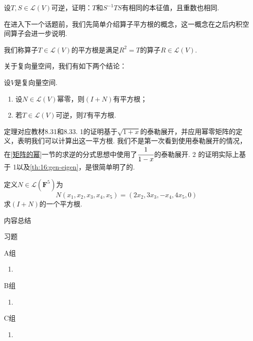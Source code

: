 \begin{example}
    设$T,S\in \mathcal{L}(V)$可逆，证明：$T$和$S^{-1}TS$有相同的本征值，且重数也相同.
\end{example}
在进入下一个话题前，我们先简单介绍算子平方根的概念，这一概念在之后内积空间算子会进一步说明.
\begin{definition}
    我们称算子$T\in \mathcal{L}(V)$的平方根是满足$R^2=T$的算子$R\in \mathcal{L}(V)$.
\end{definition}
关于复向量空间，我们有如下两个结论：
\begin{theorem} \label{th:16:np-sqrt}
    设$V$是复向量空间.
    \begin{enumerate}
        \item 设$N\in \mathcal{L}(V)$幂零，则$(I+N)$有平方根；

        \item 若$T\in \mathcal{L}(V)$可逆，则$T$有平方根.
    \end{enumerate}
\end{theorem}
定理对应教材8.31和8.33. 1的证明基于$\sqrt{1+x}$的泰勒展开，并应用幂零矩阵的定义，表明我们可以计算出这一平方根.
我们不是第一次看到使用泰勒展开的情况，在\ref{矩阵的幂}一节的求逆的分式思想中使用了$\cfrac{1}{1-x}$的泰勒展开.
2 的证明实际上基于 1以及\autoref{th:16:gen-eigen}，是很简单明了的.
\begin{example}
    定义$N\in \mathcal{L}(\mathbf{F}^5)$为
    \[N(x_1,x_2,x_3,x_4,x_5)=(2x_2,3x_3,-x_4,4x_5,0)\]
    求$(I+N)$的一个平方根.
\end{example}

\vspace{2ex}
\centerline{\heiti \Large 内容总结}

\vspace{2ex}

\centerline{\heiti \Large 习题}
\vspace{2ex}
{\kaishu }
\begin{flushright}
    \kaishu

\end{flushright}
\centerline{\heiti A组}
\begin{enumerate}
    \item
\end{enumerate}
\centerline{\heiti B组}
\begin{enumerate}
    \item
\end{enumerate}
\centerline{\heiti C组}
\begin{enumerate}
    \item
\end{enumerate}
